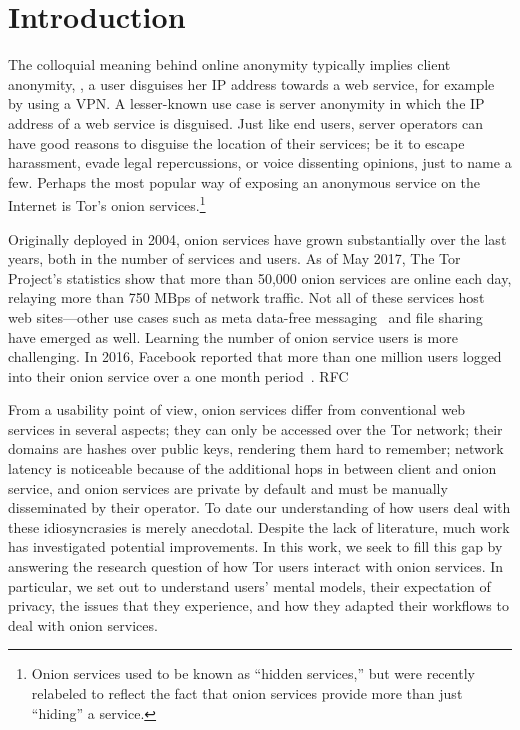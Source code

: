 \section{Introduction}
\label{sec:introduction}

The colloquial meaning behind online anonymity typically implies client
anonymity, \ie, a user disguises her IP address towards a web service, for
example by using a VPN.  A lesser-known use case is server anonymity in which
the IP address of a web service is disguised.  Just like end users, server
operators can have good reasons to disguise the location of their services; be
it to escape harassment, evade legal repercussions, or voice dissenting
opinions, just to name a few.  Perhaps the most popular way of exposing an
anonymous service on the Internet is Tor's onion services.\footnote{Onion
services used to be known as ``hidden services,'' but were recently relabeled to
reflect the fact that onion services provide more than just ``hiding'' a
service.}

Originally deployed in 2004, onion services have grown substantially over the
last years, both in the number of services and users.  As of May 2017, The Tor
Project's statistics show that more than 50,000 onion services are online each
day, relaying more than 750 MBps of network traffic.  Not all of these services
host web sites---other use cases such as meta data-free
messaging~\cite{ricochet} and file sharing~\cite{onionshare} have emerged as
well.  Learning the number of onion service users is more challenging.  In 2016,
Facebook reported that more than one million users logged into their onion
service over a one month period~\cite{facebook-users}.  RFC~\cite{rfc7686}

From a usability point of view, onion services differ from conventional web
services in several aspects; \first they can only be accessed over the Tor
network; \second their domains are hashes over public keys, rendering them hard
to remember; \third network latency is noticeable because of the additional hops
in between client and onion service, and \fourth onion services are private by
default and must be manually disseminated by their operator. To date our
understanding of how users deal with these idiosyncrasies is merely anecdotal.
Despite the lack of literature, much work has investigated potential
improvements.  In this work, we seek to fill this gap by answering the research
question of how Tor users interact with onion services.  In particular, we set
out to understand users' mental models, their expectation of privacy, the issues
that they experience, and how they adapted their workflows to deal with onion
services.

